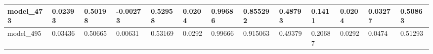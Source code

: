 \begin{tabular}{|l|l|l|l|l|l|l|l|l|l|l|l|l|}
model\_473     & 0.02393     & 0.50198        & -0.00273     & 0.52958          & 0.0204               & 0.99686              & 0.855292     & 0.48793           & 0.1411             & 0.0204          & 0.03277     & 0.50863      \\ \hline
model\_495     & 0.03436     & 0.50665        & 0.00631      & 0.53169          & 0.0292               & 0.99666              & 0.915063     & 0.49379           & 0.20687            & 0.0292          & 0.0474      & 0.51293      \\ \hline
\end{tabular}